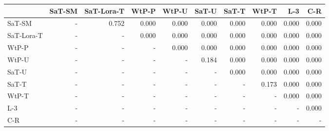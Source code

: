 \begin{tabular}{lrrrrrrrrr}
\toprule
 & SaT-SM & SaT-Lora-T & WtP-P & WtP-U & SaT-U & SaT-T & WtP-T & L-3 & C-R \\
\midrule
SaT-SM & - & 0.752 & 0.000 & 0.000 & 0.000 & 0.000 & 0.000 & 0.000 & 0.000 \\
SaT-Lora-T & - & - & 0.000 & 0.000 & 0.000 & 0.000 & 0.000 & 0.000 & 0.000 \\
WtP-P & - & - & - & 0.000 & 0.000 & 0.000 & 0.000 & 0.000 & 0.000 \\
WtP-U & - & - & - & - & 0.184 & 0.000 & 0.000 & 0.000 & 0.000 \\
SaT-U & - & - & - & - & - & 0.000 & 0.000 & 0.000 & 0.000 \\
SaT-T & - & - & - & - & - & - & 0.173 & 0.000 & 0.000 \\
WtP-T & - & - & - & - & - & - & - & 0.000 & 0.000 \\
L-3 & - & - & - & - & - & - & - & - & 0.000 \\
C-R & - & - & - & - & - & - & - & - & - \\
\bottomrule
\end{tabular}

